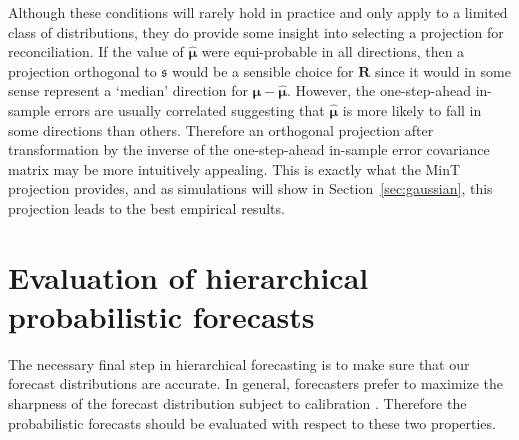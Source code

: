 \documentclass[a4paper, 11pt]{article}
\theoremstyle{definition}
\begin{document}
Although these conditions will rarely hold in practice and only apply to a limited class of distributions, they do provide some insight into selecting a projection for reconciliation. If the value of $\hat{\bm{\mu}}$ were equi-probable in all directions, then a projection orthogonal to $\mathfrak{s}$ would be a sensible choice for $\bm{R}$ since it would in some sense represent a `median' direction for $\bm{\mu}-\hat{\bm{\mu}}$. However, the one-step-ahead in-sample errors are usually correlated suggesting that $\hat{\bm{\mu}}$ is more likely to fall in some directions than others. Therefore an orthogonal projection after transformation by the inverse of the one-step-ahead in-sample error covariance matrix may be more intuitively appealing. This is exactly what the MinT projection provides, and as simulations will show in Section~\ref{sec:gaussian}, this projection leads to the best empirical results.


\section{Evaluation of hierarchical probabilistic forecasts}\label{sec:evaluation}

The necessary final step in hierarchical forecasting is to make sure that our forecast distributions are accurate. In general, forecasters prefer to maximize the sharpness of the forecast distribution subject to calibration \citep{Gneiting2014}. Therefore the probabilistic forecasts should be evaluated with respect to these two properties.
\end{document}
